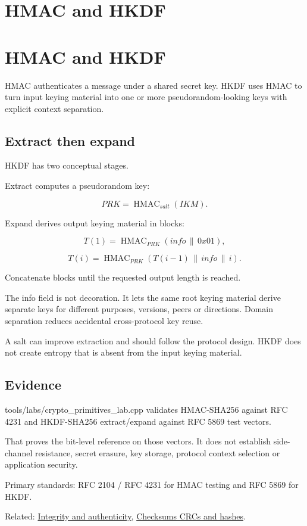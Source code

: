 \hypertarget{appendix-50af792c9da7}{}
\section*{HMAC and HKDF}
\section{HMAC and HKDF}\label{appendix-50af792c9da7-hmac-and-hkdf}

HMAC authenticates a message under a shared secret key. HKDF uses HMAC to turn input keying material into one or more pseudorandom-looking keys with explicit context separation.

\subsection{Extract then expand}\label{appendix-50af792c9da7-extract-then-expand}

HKDF has two conceptual stages.

Extract computes a pseudorandom key:

\[
PRK=\operatorname{HMAC}_{salt}(IKM).
\]

Expand derives output keying material in blocks:

\[
T(1)=\operatorname{HMAC}_{PRK}(info\,\|\,0x01),
\]

\[
T(i)=\operatorname{HMAC}_{PRK}(T(i-1)\,\|\,info\,\|\,i).
\]

Concatenate blocks until the requested output length is reached.

The info field is not decoration. It lets the same root keying material derive separate keys for different purposes, versions, peers or directions. Domain separation reduces accidental cross-protocol key reuse.

A salt can improve extraction and should follow the protocol design. HKDF does not create entropy that is absent from the input keying material.

\subsection{Evidence}\label{appendix-50af792c9da7-evidence}

tools/labs/crypto\_primitives\_lab.cpp validates HMAC-SHA256 against RFC 4231 and HKDF-SHA256 extract/expand against RFC 5869 test vectors.

That proves the bit-level reference on those vectors. It does not establish side-channel resistance, secret erasure, key storage, protocol context selection or application security.

Primary standards: RFC 2104 / RFC 4231 for HMAC testing and RFC 5869 for HKDF.

Related: \hyperref[appendix-cbe594d1ab0a]{Integrity and authenticity}, \hyperref[appendix-ed338677de0a]{Checksums CRCs and hashes}.
